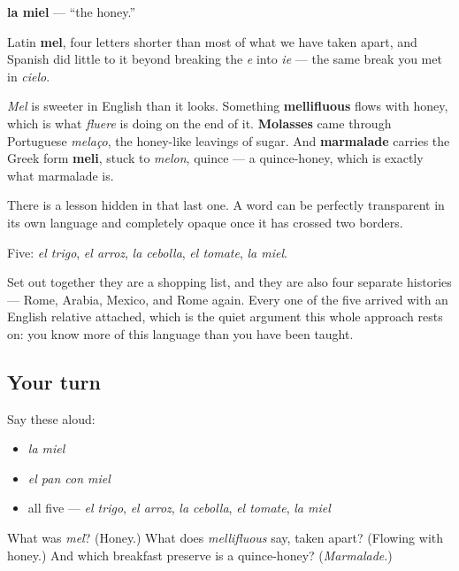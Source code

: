 \begin{cousinweb}
\textbf{la miel} — \textquotedblleft{}the honey.\textquotedblright{}

Latin \textbf{mel}, four letters shorter than most of what we have taken apart, and Spanish did little to it beyond breaking the \emph{e} into \emph{ie} — the same break you met in \emph{cielo}.

\emph{Mel} is sweeter in English than it looks. Something \textbf{mellifluous} flows with honey, which is what \emph{fluere} is doing on the end of it. \textbf{Molasses} came through Portuguese \emph{melaço}, the honey-like leavings of sugar. And \textbf{marmalade} carries the Greek form \textbf{meli}, stuck to \emph{melon}, quince — a quince-honey, which is exactly what marmalade is.

There is a lesson hidden in that last one. A word can be perfectly transparent in its own language and completely opaque once it has crossed two borders.
\end{cousinweb}

\begin{grammarlens}[title={What you've built}]
Five: \emph{el trigo}, \emph{el arroz}, \emph{la cebolla}, \emph{el tomate}, \emph{la miel}.

Set out together they are a shopping list, and they are also four separate histories — Rome, Arabia, Mexico, and Rome again. Every one of the five arrived with an English relative attached, which is the quiet argument this whole approach rests on: you know more of this language than you have been taught.
\end{grammarlens}

\subsection*{Your turn}
Say these aloud:

\begin{itemize}
\raggedright
  \item \emph{la miel}
  \item \emph{el pan con miel}
  \item all five — \emph{el trigo}, \emph{el arroz}, \emph{la cebolla}, \emph{el tomate}, \emph{la miel}
\end{itemize}

\begin{tcolorbox}[breakable,colback=teal!4,colframe=teal!35!black,title={Before you move on}]
What was \emph{mel}? (Honey.) What does \emph{mellifluous} say, taken apart? (Flowing with honey.) And which breakfast preserve is a quince-honey? (\emph{Marmalade}.)
\end{tcolorbox}
